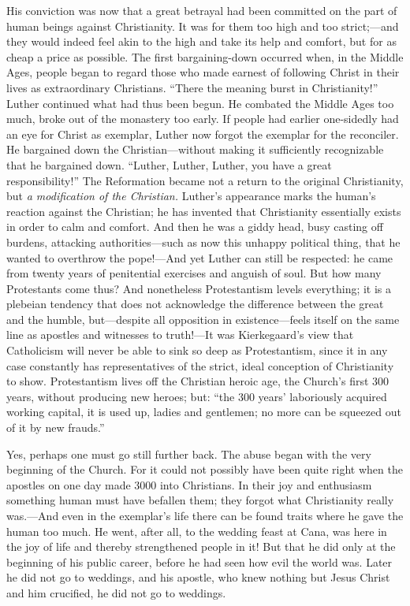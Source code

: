 \documentclass[12pt,a4paper]{book}
\newcommand{\opage}[1]{\marginnote{\footnotesize\textit{[#1]}}}
\begin{document}
His conviction was now that a great betrayal had been committed on the
part of human beings against Christianity. It was for them too high and
too strict;---and they would indeed feel akin to the high and take its
help and comfort, but for as cheap a price as possible. The first
bargaining-down occurred when, in the Middle Ages, people began to
regard those who made earnest of following Christ in their lives as
extraordinary Christians. ``There
\opage{139}the meaning burst in Christianity!'' Luther continued what had
thus been begun. He combated the Middle Ages too much, broke out of the
monastery too early. If people had earlier one-sidedly had an eye for
Christ as exemplar, Luther now forgot the exemplar for the reconciler.
He bargained down the Christian---without making it sufficiently
recognizable that he bargained down. ``Luther, Luther, Luther, you have
a great responsibility!'' The Reformation became not a return to the
original Christianity, but \textit{a modification of the Christian.}
Luther's appearance marks the human's reaction against the Christian;
he has invented that Christianity essentially exists in order to calm
and comfort. And then he was a giddy head, busy casting off burdens,
attacking authorities---such as now this unhappy political thing, that
he wanted to overthrow the pope!---And yet Luther can still be
respected: he came from twenty years of penitential exercises and
anguish of soul. But how many Protestants come thus? And nonetheless
Protestantism levels everything; it is a plebeian tendency that does
not acknowledge the difference between the great and the humble,
but---despite all opposition in existence---feels itself on the same
line as apostles and witnesses to truth!---It was Kierkegaard's view
that Catholicism will never be able to sink so deep as Protestantism,
since it in any case constantly has representatives of the strict, ideal
conception of Christianity to show. Protestantism lives off the
Christian heroic age, the Church's first 300 years, without producing
new heroes; but: ``the 300 years' laboriously acquired working capital,
it is used up, ladies and gentlemen; no more can be squeezed out of it
by new frauds.''

Yes, perhaps one must go still further back. The abuse began with the
very beginning of the Church. For it could not possibly have been quite
right when the apostles
\opage{140}on one day made 3000 into Christians. In their joy and
enthusiasm something human must have befallen them; they forgot what
Christianity really was.---And even in the exemplar's life there can be
found traits where he gave the human too much.
He went, after all, to the wedding feast at Cana, was here in the joy of
life and thereby strengthened people in it! But that he did only at the
beginning of his public career, before he had seen how evil the world
was. Later he did not go to weddings, and his apostle, who knew nothing
but Jesus Christ and him crucified, he did not go to weddings.
\end{document}
